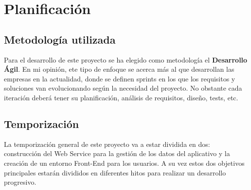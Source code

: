 \chapter{Planificación}

\section{Metodología utilizada}

Para el desarrollo de este proyecto se ha elegido como metodología el \textbf{Desarrollo Ágil}.
En mi opinión, ete tipo de enfoque se acerca más al que desarrollan las empresas en la actualidad, donde se
definen sprints en los que los requisitos y soluciones van evolucionando según la necesidad del proyecto.
No obstante cada iteración deberá tener su planificación, análisis de requisitos, diseño, tests, etc.

\section{Temporización}

La temporización general de este proyecto va a estar dividida en dos: construcción del Web Service para la
gestión de los datos del aplicativo y la creación de un entorno Front-End para los usuarios. A su vez estos dos
objetivos principales estarán divididos en diferentes hitos para realizar un desarrollo progresivo.

